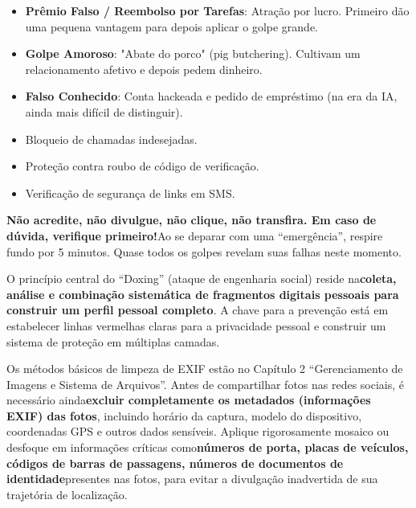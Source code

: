 
\begin{itemize}
  \item \textbf{Prêmio Falso / Reembolso por Tarefas}: Atração por lucro. Primeiro dão uma pequena vantagem para depois aplicar o golpe grande.
  \item \textbf{Golpe Amoroso}: "Abate do porco" (pig butchering). Cultivam um relacionamento afetivo e depois pedem dinheiro.
  \item \textbf{Falso Conhecido}: Conta hackeada e pedido de empréstimo (na era da IA, ainda mais difícil de distinguir).
\end{itemize}


\begin{itemize}
  \item Bloqueio de chamadas indesejadas.
  \item Proteção contra roubo de código de verificação.
  \item Verificação de segurança de links em SMS.
\end{itemize}


\textbf{Não acredite, não divulgue, não clique, não transfira. Em caso de dúvida, verifique primeiro!}Ao se deparar com uma “emergência”, respire fundo por 5 minutos. Quase todos os golpes revelam suas falhas neste momento.


O princípio central do “Doxing” (ataque de engenharia social) reside na\textbf{coleta, análise e combinação sistemática de fragmentos digitais pessoais para construir um perfil pessoal completo}. A chave para a prevenção está em estabelecer linhas vermelhas claras para a privacidade pessoal e construir um sistema de proteção em múltiplas camadas.


Os métodos básicos de limpeza de EXIF estão no Capítulo 2 “Gerenciamento de Imagens e Sistema de Arquivos”. Antes de compartilhar fotos nas redes sociais, é necessário ainda\textbf{excluir completamente os metadados (informações EXIF) das fotos}, incluindo horário da captura, modelo do dispositivo, coordenadas GPS e outros dados sensíveis. Aplique rigorosamente mosaico ou desfoque em informações críticas como\textbf{números de porta, placas de veículos, códigos de barras de passagens, números de documentos de identidade}presentes nas fotos, para evitar a divulgação inadvertida de sua trajetória de localização.

